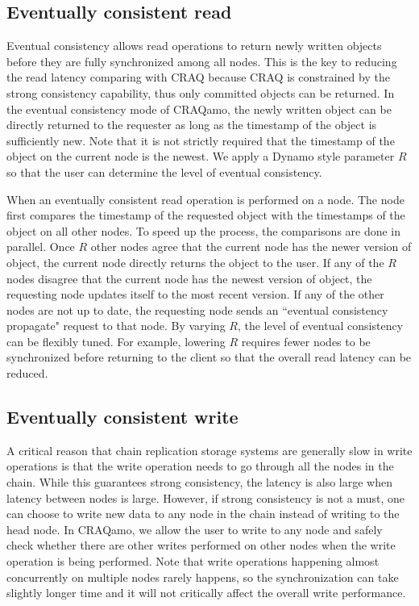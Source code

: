 \subsection{Eventually consistent read}
Eventual consistency allows read operations to return newly written objects before they are fully synchronized among all nodes. This is the key to reducing the read latency comparing with CRAQ because CRAQ is constrained by the strong consistency capability, thus only committed objects can be returned. In the eventual consistency mode of CRAQamo, the newly written object can be directly returned to the requester as long as the timestamp of the object is sufficiently new. Note that it is not strictly required that the timestamp of the object on the current node is the newest. We apply a Dynamo style parameter $R$ so that the user can determine the level of eventual consistency.

When an eventually consistent read operation is performed on a node. The node first compares the timestamp of the requested object with the timestamps of the object on all other nodes. To speed up the process, the comparisons are done in parallel. Once $R$ other nodes agree that the current node has the newer version of object, the current node directly returns the object to the user. If any of the $R$ nodes disagree that the current node has the newest version of object, the requesting node updates itself to the most recent version. If any of the other nodes are not up to date, the requesting node sends an ``eventual consistency propagate" request to that node.  By varying $R$, the level of eventual consistency can be flexibly tuned. For example, lowering $R$ requires fewer nodes to be synchronized before returning to the client so that the overall read latency can be reduced.

\subsection{Eventually consistent write}
A critical reason that chain replication storage systems are generally slow in write operations is that the write operation needs to go through all the nodes in the chain. While this guarantees strong consistency, the latency is also large when latency between nodes is large. However, if strong consistency is not a must, one can choose to write new data to any node in the chain instead of writing to the head node. In CRAQamo, we allow the user to write to any node and safely check whether there are other writes performed on other nodes when the write operation is being performed. Note that write operations happening almost concurrently on multiple nodes rarely happens, so the synchronization can take slightly longer time and it will not critically affect the overall write performance.


